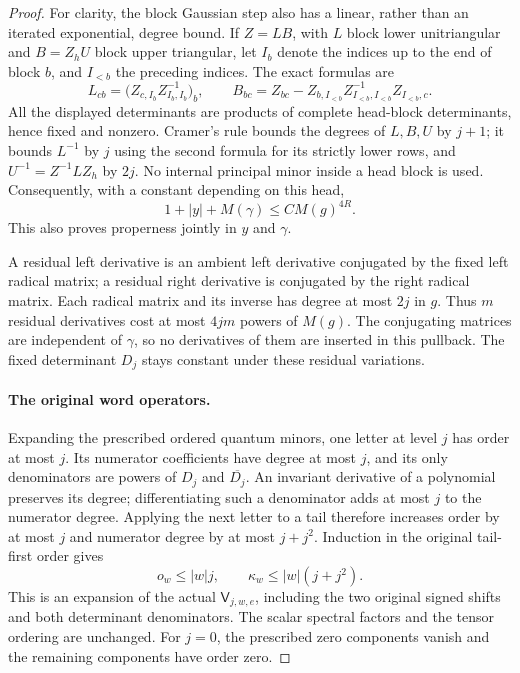 \begin{proof}
For clarity, the block Gaussian step also has a linear, rather than
an iterated exponential, degree bound.  If $Z=L B$, with $L$ block
lower unitriangular and $B=Z_hU$ block upper triangular, let
$I_b$ denote the indices up to the end of block $b$, and $I_{<b}$
the preceding indices.  The exact formulas are
\[
 L_{cb}=\bigl(Z_{c,I_b}Z_{I_b,I_b}^{-1}\bigr)_{b},\qquad
 B_{bc}=Z_{bc}-Z_{b,I_{<b}}Z_{I_{<b},I_{<b}}^{-1}Z_{I_{<b},c}.
\]
All the displayed determinants are products of complete head-block
determinants, hence fixed and nonzero.  Cramer's rule bounds the
degrees of $L,B,U$ by $j+1$; it bounds $L^{-1}$ by $j$ using the
second formula for its strictly lower rows, and $U^{-1}=Z^{-1}LZ_h$
by $2j$.  No internal principal minor inside a head block is used.
Consequently, with a constant depending on this head,
\begin{equation}\label{finite-decay-polynomial-properness}
           1+|y|+M(\gamma)\le C M(g)^{4R}.
\end{equation}
This also proves properness jointly in $y$ and $\gamma$.

A residual left derivative is an ambient left derivative conjugated
by the fixed left radical matrix; a residual right derivative is
conjugated by the right radical matrix.  Each radical matrix and
its inverse has degree at most $2j$ in $g$.  Thus $m$ residual
derivatives cost at most $4jm$ powers of $M(g)$.  The conjugating
matrices are independent of $\gamma$, so no derivatives of them
are inserted in this pullback.  The fixed determinant $D_j$ stays
constant under these residual variations.

\paragraph{The original word operators.}
Expanding the prescribed ordered quantum minors, one letter at
level $j$ has order at most $j$.  Its numerator coefficients have
degree at most $j$, and its only denominators are powers of $D_j$
and $\overline{D_j}$.  An invariant derivative of a polynomial
preserves its degree; differentiating such a denominator adds at
most $j$ to the numerator degree.  Applying the next letter to a
tail therefore increases order by at most $j$ and numerator degree
by at most $j+j^2$.  Induction in the original tail-first order
gives
\begin{equation}\label{finite-decay-word-degree}
        o_w\le |w|j,\qquad
        \kappa_w\le |w|(j+j^2).
\end{equation}
This is an expansion of the actual $\mathsf V_{j,w,e}$, including
the two original signed shifts and both determinant denominators.
The scalar spectral factors and the tensor ordering are unchanged.
For $j=0$, the prescribed zero components vanish and the remaining
components have order zero.


\end{proof}
